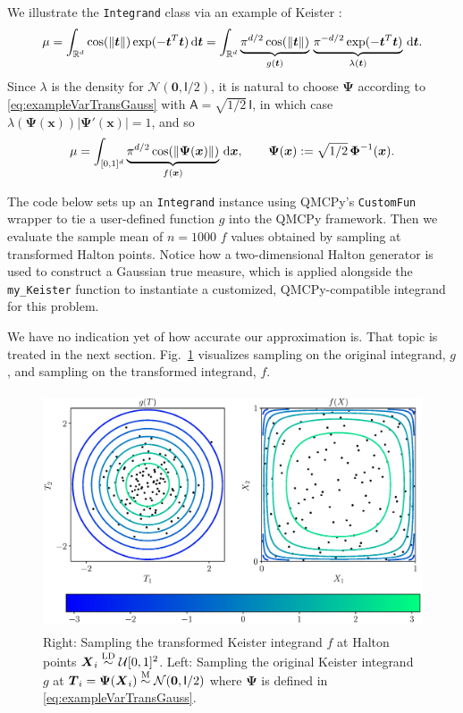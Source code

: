 \documentclass[graybox]{svmult}
\begin{document}
We illustrate the \texttt{Integrand} class via an example of Keister \cite{Kei96}:
\begin{equation} \label{eq:KeisterIntegral}
	\mu 
	= \int_{\mathbb{R}^d} \cos(\lVert \boldsymbol{t} \rVert) \exp(-\boldsymbol{t}^T \boldsymbol{t}) \, \D \boldsymbol{t} \\ 
	= \int_{\mathbb{R}^d} \underbrace{\pi^{d/2} \cos(\lVert \boldsymbol{t} \rVert)}_{g(\boldsymbol{t})}\, \underbrace{\pi^{-d/2} \exp(-\boldsymbol{t}^T \boldsymbol{t}) }_{\lambda(\boldsymbol{t})} \, \D \boldsymbol{t}.
\end{equation}
Since $\lambda$ is the density for $\mathcal{N}(\boldsymbol{0},\mathsf{I}/2)$, it is natural to choose $\boldsymbol{\Psi}$ according to \eqref{eq:exampleVarTransGauss} with $\mathsf{A} = \sqrt{1/2} \, \mathsf{I}$, in which case $\lambda(\boldsymbol{\Psi}(\boldsymbol{x})) \lvert \boldsymbol{\Psi}'(\boldsymbol{x})\rvert  = 1$, and so 
\[
\mu = \int_{[0,1]^d} \underbrace{\pi^{d/2} \cos(\lVert \boldsymbol{\Psi}(\boldsymbol{x}) \rVert)}_{f(\boldsymbol{x})} \, \mathrm{d} \boldsymbol{x}, \qquad 
\boldsymbol{\Psi}(\boldsymbol{x}) := \sqrt{1/2} \,\boldsymbol{\Phi}^{-1}(\boldsymbol{x}).
\]

The code below sets up an \texttt{Integrand} instance using QMCPy's \texttt{CustomFun} wrapper to tie a user-defined function $g$ into the QMCPy framework.  Then we evaluate the sample mean of $n=1000$ $f$ values obtained by sampling at transformed Halton points. Notice how a two-dimensional Halton generator is used to construct a Gaussian true measure, which is applied alongside the \texttt{my\_Keister} function to instantiate a customized, QMCPy-compatible integrand for this problem.

We have no indication yet of how accurate our approximation is.  That topic is treated in the next section.  
Fig.~\ref{fig:ikc} visualizes sampling on the original integrand, $g$, and sampling on the transformed integrand, $f$. 

\begin{figure}[t]
	\includegraphics[height=7cm]{QMCSoftwareArticle/vfigs/i_keister_contours.eps}
	\caption{Right: Sampling the transformed Keister integrand $f$ at Halton points $\boldsymbol{X}_i \overset{\textup{LD}}{\sim} \mathcal{U}[0,1]^2$. Left: Sampling the original Keister integrand $g$ at $\boldsymbol{T}_i = \boldsymbol{\Psi}(\boldsymbol{X}_i) \overset{\textup{M}}{\sim} \mathcal{N}(\boldsymbol{0},\mathsf{I}/2)$ where $\boldsymbol{\Psi}$ is defined in \eqref{eq:exampleVarTransGauss}.  } \label{fig:ikc}
\end{figure}
\end{document}
